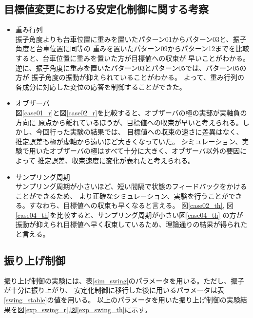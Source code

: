\subsection{目標値変更における安定化制御に関する考察}
\begin{itemize}
    \item 重み行列 \\
        振子角度よりも台車位置に重みを置いたパターン01からパターン03と、振子角度と台車位置に同等の
        重みを置いたパターン09からパターン12までを比較すると、台車位置に重みを置いた方が目標値への収束が
        早いことがわかる。逆に、振子角度に重みを置いたパターン03とパターン05では、パターン05の方が
        振子角度の振動が抑えられていることがわかる。
        よって、重み行列の各成分に対応した変位の応答を制御することができた。
    \item オブザーバ \\
        図\ref{case01_r}と図\ref{case02_r}を比較すると、オブザーバの極の実部が実軸負の方向に
        原点から離れているほうが、目標値への収束が早いと考えられる。しかし、今回行った実験の結果では、
        目標値への収束の速さに差異はなく、推定誤差も極が虚軸から遠いほど大きくなっていた。
        シミュレーション、実験で用いたオブザーバの極はすべて十分に大きく、オブザーバ以外の要因によって
        推定誤差、収束速度に変化が表れたと考えられる。
    \item サンプリング周期 \\
        サンプリング周期が小さいほど、短い間隔で状態のフィードバックをかけることができるため、
        より正確なシミュレーション、実験を行うことができる。すなわち、目標値への収束も早くなると言える。
        図\ref{case02_th}, 図\ref{case04_th}を比較すると、サンプリング周期が小さい図\ref{case04_th}
        の方が振動が抑えられ目標値へ早く収束しているため、理論通りの結果が得られたと言える。
\end{itemize}


\subsection{振り上げ制御}
振り上げ制御の実験には、表\ref{sim_swing}のパラメータを用いる。ただし、振子が十分に振り上がり、
安定化制御に移行した後に用いるパラメータは表\ref{swing_stable}の値を用いる。
以上のパラメータを用いた振り上げ制御の実験結果を図\ref{exp_swing_r},図\ref{exp_swing_th}に示す。

